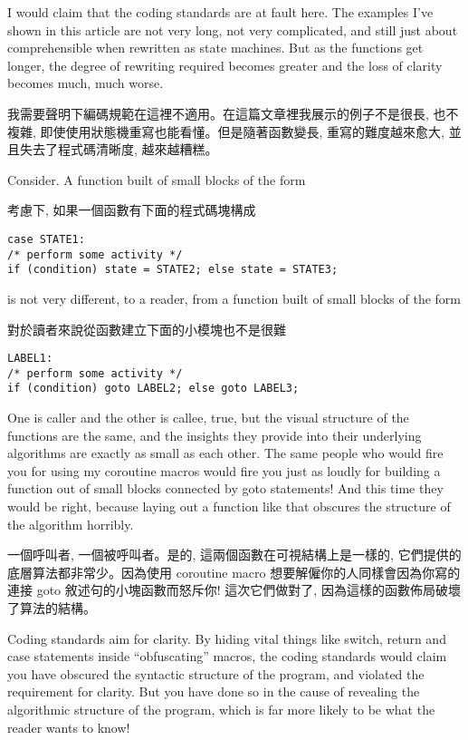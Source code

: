 \documentclass[12pt]{article}
\begin{document}
\begin{CJK}{UTF8}{bsmi}
I would claim that the coding standards are at fault here. The examples I've shown in this article are not very long, not very complicated, and still just about comprehensible when rewritten as state machines. But as the functions get longer, the degree of rewriting required becomes greater and the loss of clarity becomes much, much worse.

我需要聲明下編碼規範在這裡不適用。在這篇文章裡我展示的例子不是很長, 也不複雜, 即使使用狀態機重寫也能看懂。但是隨著函數變長, 重寫的難度越來愈大, 並且失去了程式碼清晰度, 越來越糟糕。 

Consider. A function built of small blocks of the form

考慮下, 如果一個函數有下面的程式碼塊構成 

\begin{lstlisting}[basicstyle=\footnotesize, breaklines=true]
case STATE1:
/* perform some activity */
if (condition) state = STATE2; else state = STATE3;
\end{lstlisting}

is not very different, to a reader, from a function built of small blocks of the form

 對於讀者來說從函數建立下面的小模塊也不是很難 

\begin{lstlisting}[basicstyle=\footnotesize, breaklines=true]
LABEL1:
/* perform some activity */
if (condition) goto LABEL2; else goto LABEL3;
\end{lstlisting}

One is caller and the other is callee, true, but the visual structure of the functions are the same, and the insights they provide into their underlying algorithms are exactly as small as each other. The same people who would fire you for using my coroutine macros would fire you just as loudly for building a function out of small blocks connected by goto statements! And this time they would be right, because laying out a function like that obscures the structure of the algorithm horribly.

 一個呼叫者, 一個被呼叫者。是的, 這兩個函數在可視結構上是一樣的, 它們提供的底層算法都非常少。因為使用 coroutine macro 想要解僱你的人同樣會因為你寫的連接 goto 敘述句的小塊函數而怒斥你! 這次它們做對了, 因為這樣的函數佈局破壞了算法的結構。 

Coding standards aim for clarity. By hiding vital things like switch, return and case statements inside ``obfuscating'' macros, the coding standards would claim you have obscured the syntactic structure of the program, and violated the requirement for clarity. But you have done so in the cause of revealing the algorithmic structure of the program, which is far more likely to be what the reader wants to know!


\end{CJK}
\end{document}

